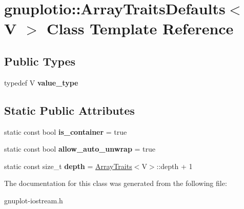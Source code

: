 \hypertarget{classgnuplotio_1_1ArrayTraitsDefaults}{}\section{gnuplotio\+:\+:Array\+Traits\+Defaults$<$ V $>$ Class Template Reference}
\label{classgnuplotio_1_1ArrayTraitsDefaults}
\subsection*{Public Types}
\begin{DoxyCompactItemize}
\item 
\mbox{\label{classgnuplotio_1_1ArrayTraitsDefaults_ad7a9e8d19419fabe2ab9cc1b76c9965b}} 
typedef V {\bfseries value\+\_\+type}
\end{DoxyCompactItemize}
\subsection*{Static Public Attributes}
\begin{DoxyCompactItemize}
\item 
\mbox{\label{classgnuplotio_1_1ArrayTraitsDefaults_a57bab5bf3617f0ee66fdd4dcb751aa21}} 
static const bool {\bfseries is\+\_\+container} = true
\item 
\mbox{\label{classgnuplotio_1_1ArrayTraitsDefaults_ac8d430cba6ceefc6f52706455f12a0e8}} 
static const bool {\bfseries allow\+\_\+auto\+\_\+unwrap} = true
\item 
\mbox{\label{classgnuplotio_1_1ArrayTraitsDefaults_ac51367f5da9096249b162af1496e36ab}} 
static const size\+\_\+t {\bfseries depth} = \hyperlink{classgnuplotio_1_1ArrayTraits}{Array\+Traits}$<$V$>$\+::depth + 1
\end{DoxyCompactItemize}


The documentation for this class was generated from the following file\+:\begin{DoxyCompactItemize}
\item 
gnuplot-\/iostream.\+h\end{DoxyCompactItemize}
